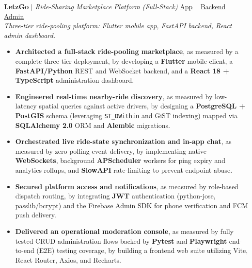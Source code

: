 \documentclass[10pt,letterpaper]{article}
\newenvironment{highlights}{
  \begin{itemize}[topsep=2pt,parsep=1pt,partopsep=0pt,itemsep=0pt,leftmargin=10pt]
}{\end{itemize}}
\begin{document}
\textbf{LetzGo} $|$ \textit{Ride-Sharing Marketplace Platform (Full-Stack)}
\hfill
\href{https://github.com/H-Yeasin/letzgo_frontend}{\textcolor{myblue}{App}} \textbullet~
\href{https://github.com/H-Yeasin/letzgo_backend}{\textcolor{myblue}{Backend}} \textbullet~
\href{https://github.com/H-Yeasin/letzgo-admin}{\textcolor{myblue}{Admin}}\\
\textit{Three-tier ride-pooling platform: Flutter mobile app, FastAPI backend, React admin dashboard.}
\begin{highlights}
  \item \textbf{Architected a full-stack ride-pooling marketplace}, as measured by a complete three-tier deployment, by developing a \textbf{Flutter} mobile client, a \textbf{FastAPI/Python} REST and WebSocket backend, and a \textbf{React 18 + TypeScript} administration dashboard.
  \item \textbf{Engineered real-time nearby-ride discovery}, as measured by low-latency spatial queries against active drivers, by designing a \textbf{PostgreSQL + PostGIS} schema (leveraging \texttt{ST\_DWithin} and GiST indexing) mapped via \textbf{SQLAlchemy 2.0} ORM and \textbf{Alembic} migrations.
  \item \textbf{Orchestrated live ride-state synchronization and in-app chat}, as measured by zero-polling event delivery, by implementing native \textbf{WebSockets}, background \textbf{APScheduler} workers for ping expiry and analytics rollups, and \textbf{SlowAPI} rate-limiting to prevent endpoint abuse.
  \item \textbf{Secured platform access and notifications}, as measured by role-based dispatch routing, by integrating \textbf{JWT} authentication (python-jose, passlib/bcrypt) and the Firebase Admin SDK for phone verification and FCM push delivery.
  \item \textbf{Delivered an operational moderation console}, as measured by fully tested CRUD administration flows backed by \textbf{Pytest} and \textbf{Playwright} end-to-end (E2E) testing coverage, by building a frontend web suite utilizing Vite, React Router, Axios, and Recharts.
\end{highlights}

\vspace{3pt}
\end{document}
